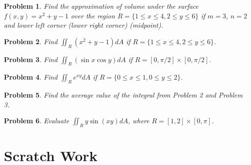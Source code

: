 \documentclass[11pt]{article}
\newtheorem{problem}{Problem}
\begin{document}
\begin{problem}
    Find the approximation of volume under the surface $f(x,y) = x^2+y - 1$ over the region $R=\{1\leq x \leq 4, 2\leq y \leq 6\}$ if $m=3$, $n=2$ and lower left corner (lower right corner) (midpoint).
\end{problem}


\newpage

\begin{problem}
     Find $\iint_R (x^2 + y -1) dA$ if $R=\{1\leq x \leq 4, 2\leq y \leq 6\}$.
\end{problem}

\vspace{5cm}

\begin{problem}
     Find $\iint_R (\sin{x} \cos{y}) dA$ if $R= [0, \pi/2] \times [0, \pi/2]$.
\end{problem}

\vspace{5cm}

\begin{problem}
     Find $\iint_R e^{xy} dA$ if $R=\{0\leq x \leq 1, 0\leq y \leq 2\}$.
\end{problem}



\vspace{10cm}


\begin{problem}
    Find the average value of the integral from Problem 2 and Problem 3.
\end{problem}




\vspace{6cm}


\begin{problem}
    Evaluate $\iint_R y\sin(xy) dA$, where $R = [1,2] \times [0, \pi]$.
\end{problem}
\newpage

\section{Scratch Work}
\end{document}
